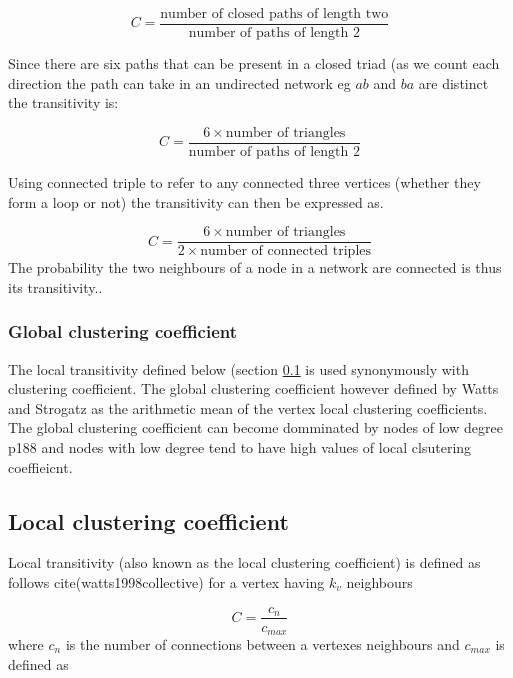 \begin{equation}
    C = \frac{\textrm{number of closed paths of length two}}{\textrm{number of paths of length 2}}
\end{equation}

Since there are six paths that can be present in a closed triad (as we count each direction the path can take in an undirected network eg $ab$ and $ba$ are distinct the transitivity is:

\begin{equation}
    C = \frac{6 \times \textrm{number of triangles}}{\textrm{number of paths of length 2}}
\end{equation}

Using connected triple to refer to any connected three vertices (whether they form a loop or not) the transitivity can then be expressed as.

\begin{equation}
    C = \frac{6 \times \textrm{number of triangles}}{2 \times \textrm{number of connected triples}}
\end{equation}
The probability the two neighbours of a node in a network are connected is thus its transitivity.\cite{newman2018networks}. 



\subsubsection{Global clustering coefficient}
\label{sec:Global clustering coefficient}
The local transitivity defined below (section \ref{sec:local clustering coefficient} is used synonymously with clustering coefficient. The global clustering coefficient however defined by Watts and Strogatz as the arithmetic mean of the vertex local clustering coefficients. The global clustering coefficient can become domminated by nodes of low degree \cite{newman2018networks} p188 and nodes with low degree tend to have high values of local clsutering coeffieicnt. 

\subsection{Local clustering coefficient}
\label{sec:local clustering coefficient}
Local transitivity (also known as the local clustering coefficient) is defined as  follows cite(watts1998collective) for a vertex having $k_v$ neighbours 

\begin{equation}
C = \frac{c_n}{c_{max}}
\end{equation}
where $c_n$ is the number of connections between a vertexes neighbours and $c_{max}$ is defined as 

